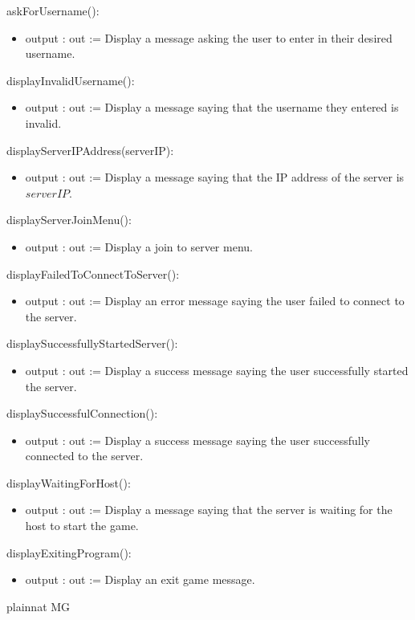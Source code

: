 \documentclass[12pt, titlepage]{article}
\begin{document}
        \noindent askForUsername():
        \begin{itemize}
        \item output : out := Display a message asking the user to enter in their desired username.
        \end{itemize}
        
        \noindent displayInvalidUsername():
        \begin{itemize}
        \item output : out := Display a message saying that the username they entered is invalid.
        \end{itemize}
        
        \noindent displayServerIPAddress(serverIP):
        \begin{itemize}
        \item output : out := Display a message saying that the IP address of the server is $serverIP$.
        \end{itemize}
        
        \noindent displayServerJoinMenu():
        \begin{itemize}
        \item output : out := Display a join to server menu.
        \end{itemize}
        
        \noindent displayFailedToConnectToServer():
        \begin{itemize}
        \item output : out := Display an error message saying the user failed to connect to the server.
        \end{itemize}
        
        \noindent displaySuccessfullyStartedServer():
        \begin{itemize}
        \item output : out := Display a success message saying the user successfully started the server.
        \end{itemize}
        
        \noindent displaySuccessfulConnection():
        \begin{itemize}
        \item output : out := Display a success message saying the user successfully connected to the server.
        \end{itemize}
        
        \noindent displayWaitingForHost():
        \begin{itemize}
        \item output : out := Display a message saying that the server is waiting for the host to start the game.
        \end{itemize}
        
        \noindent displayExitingProgram():
        \begin{itemize}
        \item output : out := Display an exit game message.
        \end{itemize}
        

 {plainnat}
 {MG}
\end{document}
